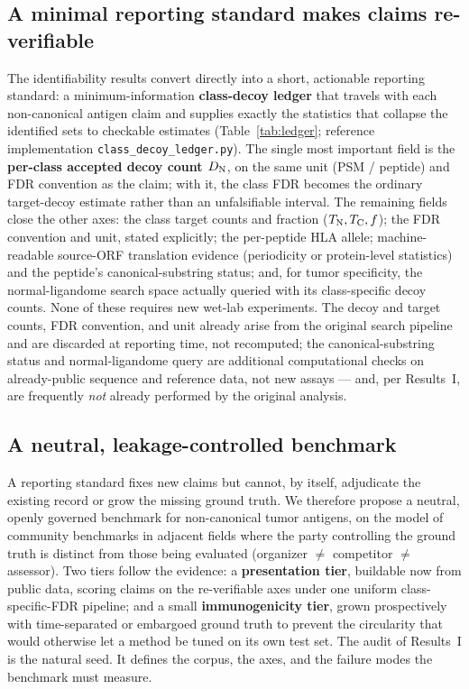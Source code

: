 \subsection{A minimal reporting standard makes claims re-verifiable}
The identifiability results convert directly into a short, actionable reporting standard: a minimum-information \textbf{class-decoy ledger} that travels with each non-canonical antigen claim and supplies exactly the statistics that collapse the identified sets to checkable estimates (Table~\ref{tab:ledger}; reference implementation \texttt{class\_decoy\_ledger.py}). The single most important field is the \textbf{per-class accepted decoy count $D_{\mathrm{N}}$}, on the same unit (PSM / peptide) and FDR convention as the claim; with it, the class FDR becomes the ordinary target-decoy estimate rather than an unfalsifiable interval. The remaining fields close the other axes: the class target counts and fraction ($T_{\mathrm{N}},T_{\mathrm{C}},f$); the FDR convention and unit, stated explicitly; the per-peptide HLA allele; machine-readable source-ORF translation evidence (periodicity or protein-level statistics) and the peptide's canonical-substring status; and, for tumor specificity, the normal-ligandome search space actually queried with its class-specific decoy counts. None of these requires new wet-lab experiments. The decoy and target counts, FDR convention, and unit already arise from the original search pipeline and are discarded at reporting time, not recomputed; the canonical-substring status and normal-ligandome query are additional computational checks on already-public sequence and reference data, not new assays --- and, per Results~I, are frequently \emph{not} already performed by the original analysis.

\subsection{A neutral, leakage-controlled benchmark}
A reporting standard fixes new claims but cannot, by itself, adjudicate the existing record or grow the missing ground truth. We therefore propose a neutral, openly governed benchmark for non-canonical tumor antigens, on the model of community benchmarks in adjacent fields where the party controlling the ground truth is distinct from those being evaluated (organizer $\ne$ competitor $\ne$ assessor). Two tiers follow the evidence: a \textbf{presentation tier}, buildable now from public data, scoring claims on the re-verifiable axes under one uniform class-specific-FDR pipeline; and a small \textbf{immunogenicity tier}, grown prospectively with time-separated or embargoed ground truth to prevent the circularity that would otherwise let a method be tuned on its own test set. The audit of Results~I is the natural seed. It defines the corpus, the axes, and the failure modes the benchmark must measure.

